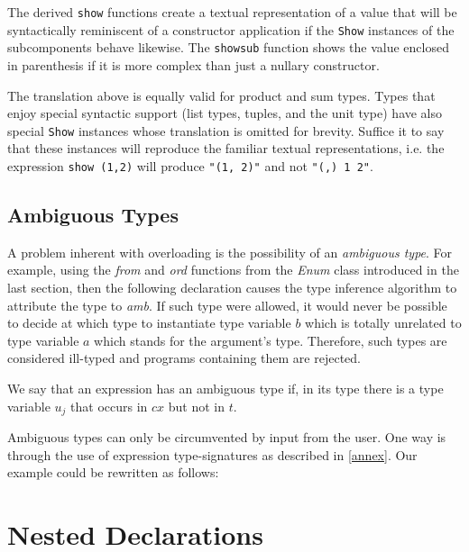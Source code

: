 The derived \texttt{show} functions create a textual representation of a value that will be syntactically reminiscent of a  constructor application if the \texttt{Show} instances of the subcomponents behave likewise. The \texttt{showsub} function shows the value enclosed in parenthesis if it is more complex than just a nullary constructor.

The translation above is equally valid for product and sum types. Types that enjoy special syntactic support (list types, tuples,  and the unit type) have also special \texttt{Show} instances whose translation is omitted for brevity. Suffice it to say that these instances will reproduce the familiar textual representations, i.e. the expression \texttt{show (1,2)} will produce \texttt{"(1, 2)"} and not \texttt{"(,) 1 2"}.

\subsection{Ambiguous Types}

A problem inherent with overloading is the possibility of an \emph{ambiguous type}.
For example, using the \emph{from} and \emph{ord} functions from the \emph{Enum} class introduced in the last section, then the following declaration
causes the type inference algorithm to attribute the type
to \emph{amb}. If such type were allowed, it would never be possible to decide at which type to instantiate type variable $b$ which is totally unrelated to type variable $a$ which stands for the argument's type. Therefore, such types are considered ill-typed and programs containing them are rejected.

We say that an expression has an ambiguous type if, in its type 
there is a type variable $u_j$ that occurs in $cx$ but not in $t$.

Ambiguous types can only be circumvented by input from the user. One way is through the use of expression
type-signatures as described in \autoref{annex}. Our example could be rewritten as follows:

\section{Nested Declarations} \label{decl}

